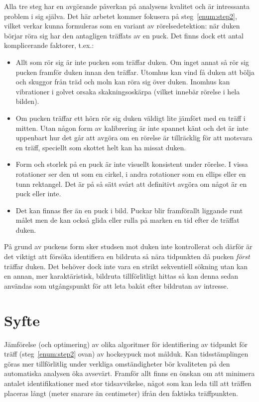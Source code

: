 \documentclass[a4paper,12pt]{article}
\begin{document}
Alla tre steg har en avgörande påverkan på analysens kvalitet och är
intressanta problem i sig själva. Det här arbetet kommer fokusera på
steg~\ref{enum:step2}, vilket verkar kunna formuleras som en variant av
rörelsedetektion: när duken börjar röra sig har den antagligen träffats av
en puck. Det finns dock ett antal komplicerande faktorer, t.ex.:

\begin{itemize}
  \item Allt som rör sig är inte pucken som träffar duken. Om inget annat så
    rör sig pucken framför duken innan den träffar. Utomhus kan vind få duken
    att bölja och skuggor från träd och moln kan röra sig över duken. Inomhus
    kan vibrationer i golvet orsaka skakningsoskärpa (vilket innebär rörelse
    i hela bilden).
  \item Om pucken träffar ett hörn rör sig duken väldigt lite jämfört med en
    träff i mitten. Utan någon form av kalibrering är inte spannet känt och
    det är inte uppenbart hur det går att avgöra om en rörelse är tillräcklig
    för att motsvara en träff, speciellt som skottet helt kan ha missat duken.
  \item Form och storlek på en puck är inte visuellt konsistent under rörelse.
    I vissa rotationer ser den ut som en cirkel, i andra rotationer som en
    ellips eller en tunn rektangel. Det är på så sätt svårt att definitivt
    avgöra om något är en puck eller inte.
  \item Det kan finnas fler än en puck i bild. Puckar blir framförallt
    liggande runt målet men de kan också glida eller rulla på marken en tid
    efter de träffat duken.
\end{itemize}

På grund av puckens form sker studsen mot duken inte kontrollerat och därför
är det viktigt att försöka identifiera en bildruta så nära tidpunkten då
pucken \textit{först} träffar duken. Det behöver dock inte vara en strikt
sekventiell sökning utan kan en annan, mer karaktäristisk, bildruta
tillförlitligt hittas så kan denna sedan användas som utgångspunkt för att
leta bakåt efter bildrutan av intresse.


\section*{Syfte}
Jämförelse (och optimering) av olika algoritmer för identifiering av tidpunkt
för träff (steg~\ref{enum:step2} ovan) av hockeypuck mot målduk. Kan
tidsstämplingen göras mer tillförlitlig under verkliga omständigheter bör
kvaliteten på den automatiska analysen öka avsevärt. Framför allt finns en
önskan om att minimera antalet identifikationer med stor tidsavvikelse, något
som kan leda till att träffen placeras långt (meter snarare än centimeter)
ifrån den faktiska träffpunkten.
\end{document}
